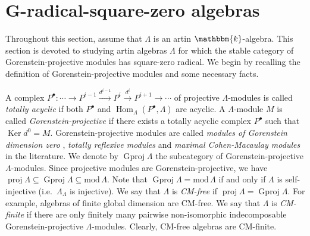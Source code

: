 \documentclass[12pt]{amsart}
\numberwithin{equation}{subsection}
\theoremstyle{plain}
\theoremstyle{definition}
\newcommand{\Hom}{\operatorname{Hom}}
\newcommand{\Ker}{\operatorname{Ker}}
\renewcommand{\mod}{\mathrm{mod}\,}
\newcommand{\proj}{\operatorname{proj}}
\newcommand{\Gproj}{\operatorname{Gproj}}
\renewcommand{\L}{\Lambda}
\begin{document}







\section{G-radical-square-zero algebras} 
\label{G-radical_square_zero_algebras}





Throughout this section, assume that $\L$ is an artin $\mathbbm{k}$-algebra. 
This section is devoted to studying artin algebras $\L$ for which the stable category of Gorenstein-projective modules has square-zero radical.
We begin by recalling the definition of Gorenstein-projective modules and some necessary facts.




A complex  $P^{\bullet} : \cdots \to P^{i-1} \xrightarrow{d^{i-1}} P^{i} \xrightarrow{d^{i}} P^{i+1} \to \cdots$ of projective $\L$-modules is called {\it totally acyclic} \cite{Avramov-Martsinkovsky_2002} if both $P^{\bullet}$ and $\Hom_{\L}(P^\bullet, \L)$ are acyclic. 
A $\L$-module $M$ is called  {\it Gorenstein-projective} \cite{Enochs-Jenda_1995_MathZ} if there exists a totally acyclic complex $P^{\bullet}$ such that $\Ker d^{0}=M$.
Gorenstein-projective modules are  called {\it modules of Gorenstein dimension zero} \cite{Auslander-Bridger_1969}, {\it totally reflexive modules} \cite{Avramov-Martsinkovsky_2002} and {\it maximal Cohen-Macaulay modules} \cite{Buchweitz_1986} in the literature.
We denote by $\Gproj\L$ the subcategory of Gorenstein-projective $\L$-modules.
Since projective modules are Gorenstein-projective, we have $\proj\L \subseteq \Gproj \L \subseteq \mod \L$.
Note that $\Gproj \L = \mod \L$ if and only if $\L$ is self-injective (i.e.~$\L_\L$ is injective).
We say that $\L$ is {\it CM-free} if $\proj\L = \Gproj \L$.
For example, algebras of finite global dimension are CM-free.
We say that $\L$ is {\it CM-finite} if there are only finitely many pairwise non-isomorphic indecomposable Gorenstein-projective $\L$-modules.
Clearly, CM-free algebras are CM-finite. 
\end{document}
